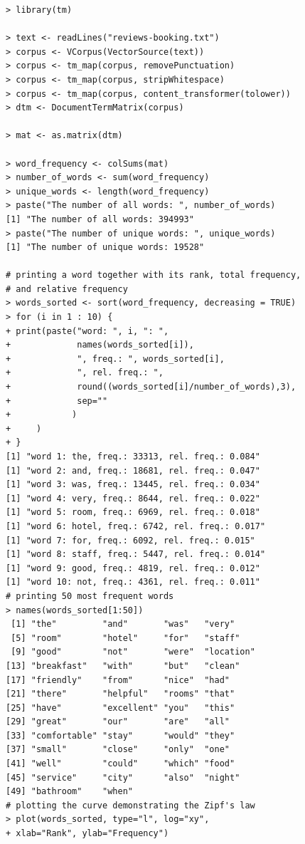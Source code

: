 \documentclass[11pt,openany,executivepaper]{book}
\begin{document}
\begin{verbatim}
> library(tm)

> text <- readLines("reviews-booking.txt")
> corpus <- VCorpus(VectorSource(text))
> corpus <- tm_map(corpus, removePunctuation)
> corpus <- tm_map(corpus, stripWhitespace)
> corpus <- tm_map(corpus, content_transformer(tolower))
> dtm <- DocumentTermMatrix(corpus)

> mat <- as.matrix(dtm)

> word_frequency <- colSums(mat)
> number_of_words <- sum(word_frequency)
> unique_words <- length(word_frequency)
> paste("The number of all words: ", number_of_words)
[1] "The number of all words: 394993"
> paste("The number of unique words: ", unique_words)
[1] "The number of unique words: 19528"

# printing a word together with its rank, total frequency,
# and relative frequency
> words_sorted <- sort(word_frequency, decreasing = TRUE)
> for (i in 1 : 10) {
+ print(paste("word: ", i, ": ",
+             names(words_sorted[i]),
+             ", freq.: ", words_sorted[i],
+             ", rel. freq.: ",
+             round((words_sorted[i]/number_of_words),3),
+             sep=""
+            )
+     )
+ }
[1] "word 1: the, freq.: 33313, rel. freq.: 0.084"
[1] "word 2: and, freq.: 18681, rel. freq.: 0.047"
[1] "word 3: was, freq.: 13445, rel. freq.: 0.034"
[1] "word 4: very, freq.: 8644, rel. freq.: 0.022"
[1] "word 5: room, freq.: 6969, rel. freq.: 0.018"
[1] "word 6: hotel, freq.: 6742, rel. freq.: 0.017"
[1] "word 7: for, freq.: 6092, rel. freq.: 0.015"
[1] "word 8: staff, freq.: 5447, rel. freq.: 0.014"
[1] "word 9: good, freq.: 4819, rel. freq.: 0.012"
[1] "word 10: not, freq.: 4361, rel. freq.: 0.011"
# printing 50 most frequent words
> names(words_sorted[1:50])
 [1] "the"         "and"       "was"   "very"
 [5] "room"        "hotel"     "for"   "staff"
 [9] "good"        "not"       "were"  "location"
[13] "breakfast"   "with"      "but"   "clean"
[17] "friendly"    "from"      "nice"  "had"
[21] "there"       "helpful"   "rooms" "that"
[25] "have"        "excellent" "you"   "this"
[29] "great"       "our"       "are"   "all"
[33] "comfortable" "stay"      "would" "they"
[37] "small"       "close"     "only"  "one"
[41] "well"        "could"     "which" "food"
[45] "service"     "city"      "also"  "night"
[49] "bathroom"    "when"
# plotting the curve demonstrating the Zipf's law
> plot(words_sorted, type="l", log="xy",
+ xlab="Rank", ylab="Frequency")
\end{verbatim}
\end{document}
